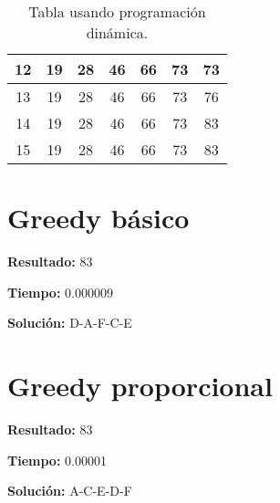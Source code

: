 \documentclass[a4paper]{article}
\begin{document}
\begin{table}[H]
\begin{tabular}{|c|c|c|c|c|c|c|}
\hline
12 & 19 \cellcolor{green!50} & 28 \cellcolor{green!50} & 46 \cellcolor{green!50} & 66 \cellcolor{green!50} & 73 \cellcolor{green!50} & 73 \cellcolor{red!50} \\
\hline
13 & 19 \cellcolor{green!50} & 28 \cellcolor{green!50} & 46 \cellcolor{green!50} & 66 \cellcolor{green!50} & 73 \cellcolor{green!50} & 76 \cellcolor{green!50} \\
\hline
14 & 19 \cellcolor{green!50} & 28 \cellcolor{green!50} & 46 \cellcolor{green!50} & 66 \cellcolor{green!50} & 73 \cellcolor{green!50} & 83 \cellcolor{green!50} \\
\hline
15 & 19 \cellcolor{green!50} & 28 \cellcolor{green!50} & 46 \cellcolor{green!50} & 66 \cellcolor{green!50} & 73 \cellcolor{green!50} & 83 \cellcolor{green!50} \\
\hline
\end{tabular}
\caption{Tabla usando programación dinámica.}
\end{table}
\section{Greedy básico}
\textbf{Resultado:} 83

\textbf{Tiempo:} 0.000009

\textbf{Solución:} D-A-F-C-E\section{Greedy proporcional}
\textbf{Resultado:} 83

\textbf{Tiempo:} 0.00001

\textbf{Solución:} A-C-E-D-F
\end{document}
